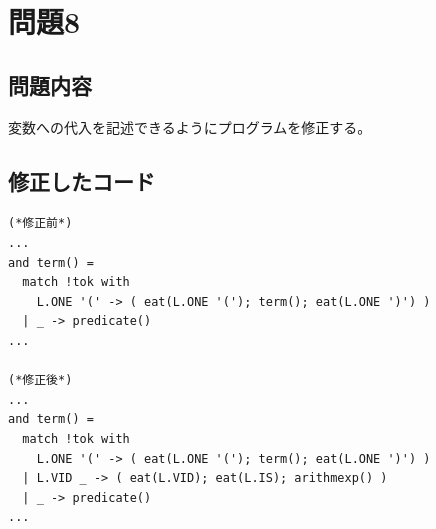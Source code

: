 \documentclass{ltjsarticle}
\begin{document}
\section{問題8}
\subsection{問題内容}
変数への代入を記述できるようにプログラムを修正する。

\subsection{修正したコード}
\begin{lstlisting}[caption = 代入 修正点]
(*修正前*)
...
and term() =
  match !tok with
    L.ONE '(' -> ( eat(L.ONE '('); term(); eat(L.ONE ')') )
  | _ -> predicate()
...

(*修正後*)
...
and term() =
  match !tok with
    L.ONE '(' -> ( eat(L.ONE '('); term(); eat(L.ONE ')') )
  | L.VID _ -> ( eat(L.VID); eat(L.IS); arithmexp() )
  | _ -> predicate()
...

\end{lstlisting}
\end{document}
